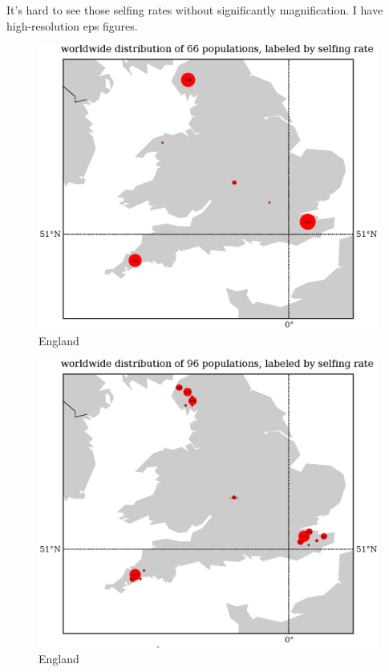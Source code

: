 \documentclass[a4paper,10pt]{article}
\begin{document}
It's hard to see those selfing rates without significantly magnification. I have high-resolution eps figures.

\begin{figure}
\includegraphics[width=1\textwidth]{figures/s0829popid2ecotypeid_25_Eng__7_49_2_55_l3y1_pop_map.eps}
\caption{England}\label{f12}
\end{figure}

\begin{figure}
\includegraphics[width=1\textwidth]{figures/s0829popid2ecotypeid_10_Eng__7_49_2_55_l3y1_pop_map.eps}
\caption{England}\label{f11}
\end{figure}
\end{document}

